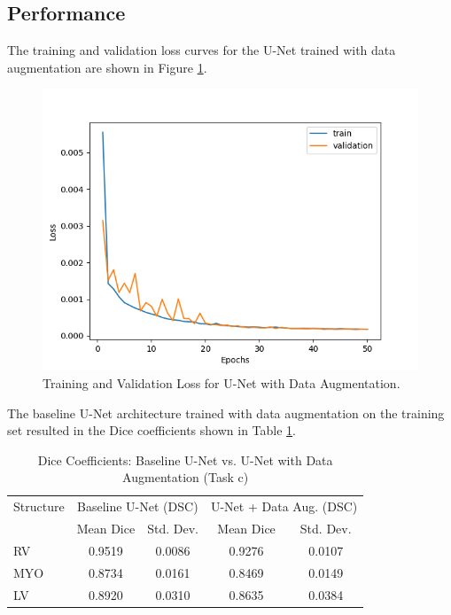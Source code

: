 \documentclass{article}
\begin{document}
\subsection{Performance}
The training and validation loss curves for the U-Net trained with data augmentation are shown in Figure \ref{fig:data_aug_loss}.
\begin{figure}[H]
  \centering
  \includegraphics[width=0.8\linewidth]{../result/baseline_unet_data_aug.png}
  \caption{Training and Validation Loss for U-Net with Data Augmentation.}
  \label{fig:data_aug_loss}
\end{figure}

The baseline U-Net architecture trained with data augmentation on the training set resulted in the Dice coefficients shown in Table \ref{tab:data_aug_unet_comparison}.
\begin{table}[H]
  \centering
  \caption{Dice Coefficients: Baseline U-Net vs. U-Net with Data Augmentation (Task c)}
  \label{tab:data_aug_unet_comparison}
  \begin{tabular}{l|cc|cc}
    \toprule
    Structure & \multicolumn{2}{c|}{Baseline U-Net (DSC)} & \multicolumn{2}{c}{U-Net + Data Aug. (DSC)}                         \\
              & Mean Dice                                 & Std. Dev.                                   & Mean Dice & Std. Dev. \\
    \midrule
    RV        & 0.9519                                    & 0.0086                                      & 0.9276    & 0.0107    \\
    MYO       & 0.8734                                    & 0.0161                                      & 0.8469    & 0.0149    \\
    LV        & 0.8920                                    & 0.0310                                      & 0.8635    & 0.0384    \\
    \bottomrule
  \end{tabular}
\end{table}
\end{document}
